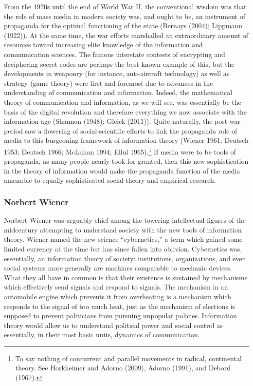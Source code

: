 \documentclass[12pt,book]{article}
\begin{document}
From the 1920s until the end of World War II, the conventional wisdom
was that the role of mass media in modern society was, and ought to be,
an instrument of propaganda for the optimal functioning of the state
(Bernays (2004); Lippmann (1922)). At the same time, the war efforts
marshalled an extraordinary amount of resources toward increasing elite
knowledge of the information and communication sciences. The famous
interstate contests of encrypting and deciphering secret codes are
perhaps the best known example of this, but the developments in weaponry
(for instance, anti-aircraft technology) as well as strategy (game
theory) were first and foremost due to advances in the understanding of
communication and information. Indeed, the mathematical theory of
communication and information, as we will see, was essentially be the
basis of the digital revolution and therefore everything we now
associate with the information age (Shannon (1948); Gleick (2011)).
Quite naturally, the post-war period saw a flowering of
social-scientific efforts to link the propaganda role of media to this
burgeoning framework of information theory (Wiener 1961; Deutsch 1953;
Deutsch 1966; McLuhan 1994; Ellul 1965).\footnote{To say nothing of
  concurrent and parallel movements in radical, continental theory. See
  Horkheimer and Adorno (2009), Adorno (1991), and Debord (1967).} If
media were to be tools of propaganda, as many people nearly took for
granted, then this new sophistication in the theory of information would
make the propaganda function of the media amenable to equally
sophisticated social theory and empirical research.

\subsubsection{Norbert Wiener}\label{norbert-wiener}

Norbert Wiener was arguably chief among the towering intellectual
figures of the midcentury attempting to understand society with the new
tools of information theory. Wiener named the new science
``cybernetics,'' a term which gained some limited currency at the time
but has since fallen into oblivion. Cybernetics was, essentially, an
information theory of society: institutions, organizations, and even
social systems more generally are machines comparable to mechanic
devices. What they all have in common is that their existence is
sustained by mechanisms which effectively send signals and respond to
signals. The mechanism in an automobile engine which prevents it from
overheating is a mechanism which responds to the signal of too much
heat, just as the mechanism of elections is supposed to prevent
politicians from pursuing unpopular policies. Information theory would
allow us to understand political power and social control as
essentially, in their most basic units, dynamics of communication.
\end{document}
